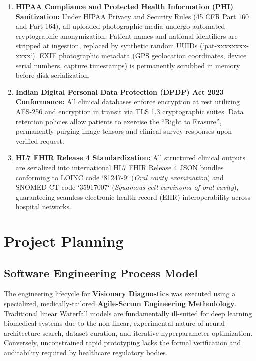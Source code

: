 \documentclass[12pt,a4paper,oneside]{report}
\begin{document}
\begin{enumerate}[label=\arabic*.]
    \item \textbf{HIPAA Compliance and Protected Health Information (PHI) Sanitization:} Under HIPAA Privacy and Security Rules (45 CFR Part 160 and Part 164), all uploaded photographic media undergo automated cryptographic anonymization. Patient names and national identifiers are stripped at ingestion, replaced by synthetic random UUIDs (`pat-xxxxxxxx-xxxx`). EXIF photographic metadata (GPS geolocation coordinates, device serial numbers, capture timestamps) is permanently scrubbed in memory before disk serialization.
    
    \item \textbf{Indian Digital Personal Data Protection (DPDP) Act 2023 Conformance:} All clinical databases enforce encryption at rest utilizing AES-256 and encryption in transit via TLS 1.3 cryptographic suites. Data retention policies allow patients to exercise the ``Right to Erasure'', permanently purging image tensors and clinical survey responses upon verified request.
    
    \item \textbf{HL7 FHIR Release 4 Standardization:} All structured clinical outputs are serialized into international HL7 FHIR Release 4 JSON bundles conforming to LOINC code `81247-9` (\textit{Oral cavity examination}) and SNOMED-CT code `35917007` (\textit{Squamous cell carcinoma of oral cavity}), guaranteeing seamless electronic health record (EHR) interoperability across hospital networks.
\end{enumerate}



\chapter{Project Planning}
\label{ch:project_planning}

\section{Software Engineering Process Model}
\label{sec:sdlc_methodology}

The engineering lifecycle for \textbf{Visionary Diagnostics} was executed using a specialized, medically-tailored \textbf{Agile-Scrum Engineering Methodology}. Traditional linear Waterfall models are fundamentally ill-suited for deep learning biomedical systems due to the non-linear, experimental nature of neural architecture search, dataset curation, and iterative hyperparameter optimization. Conversely, unconstrained rapid prototyping lacks the formal verification and auditability required by healthcare regulatory bodies.
\end{document}
